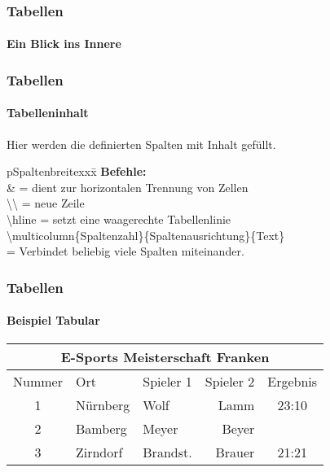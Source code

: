 \begin{frame}
\frametitle{Tabellen}
\framesubtitle{Ein Blick ins Innere}
\begin{ttfamily}

\end{ttfamily}
\end{frame}

\begin{frame}
\frametitle{Tabellen}
\framesubtitle{Tabelleninhalt}
Hier werden die definierten Spalten mit Inhalt gefüllt.\\[3mm]
\begin{tabbing}[H]p{Spaltenbreite}xxx\=\kill
\textbf{Befehle:}\\
\color{nounibaredI}\&\color{black} \>= dient zur horizontalen Trennung von Zellen\\
\color{nounibaredI}\textbackslash \textbackslash \color{black} \>=  neue Zeile\\
\color{nounibaredI}\textbackslash hline\color{black} \>= setzt eine waagerechte Tabellenlinie\\[2mm]
\color{nounibaredI}\textbackslash multicolumn\color{black}\{Spaltenzahl\}\{Spaltenausrichtung\}\{Text\}\\[2mm]
\>= Verbindet beliebig viele Spalten miteinander.\\
\end{tabbing}
\end{frame}

\begin{frame}[t]

\frametitle{Tabellen}
\framesubtitle{Beispiel Tabular}
\begin{footnotesize}
\begin{ttfamily}

\end{ttfamily}
\end{footnotesize}

\begin{tabular}{c|p{40mm}|lr|c}
\multicolumn{5}{c}{E-Sports Meisterschaft Franken}
 \\
\hline
\hline
Nummer & Ort & Spieler 1 & Spieler 2 & Ergebnis \\
\hline
1 & N\"urnberg & Wolf & Lamm & 23:10 \\
\hline
2 & Bamberg & Meyer & Beyer & \\
\hline
3 & Zirndorf & Brandst. & Brauer & 21:21 \\
\hline
\end{tabular}
\end{frame}

